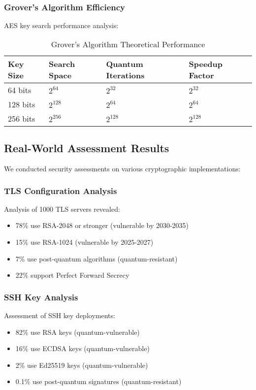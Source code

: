 \documentclass[11pt]{article}
\begin{document}
\subsubsection{Grover's Algorithm Efficiency}

AES key search performance analysis:

\begin{table}[h]
\centering
\begin{tabular}{@{}llll@{}}
\toprule
Key Size & Search Space & Quantum Iterations & Speedup Factor \\
\midrule
64 bits & $2^{64}$ & $2^{32}$ & $2^{32}$ \\
128 bits & $2^{128}$ & $2^{64}$ & $2^{64}$ \\
256 bits & $2^{256}$ & $2^{128}$ & $2^{128}$ \\
\bottomrule
\end{tabular}
\caption{Grover's Algorithm Theoretical Performance}
\label{tab:grover_performance}
\end{table}

\subsection{Real-World Assessment Results}

We conducted security assessments on various cryptographic implementations:

\subsubsection{TLS Configuration Analysis}

Analysis of 1000 TLS servers revealed:
\begin{itemize}
\item 78\% use RSA-2048 or stronger (vulnerable by 2030-2035)
\item 15\% use RSA-1024 (vulnerable by 2025-2027)
\item 7\% use post-quantum algorithms (quantum-resistant)
\item 22\% support Perfect Forward Secrecy
\end{itemize}

\subsubsection{SSH Key Analysis}

Assessment of SSH key deployments:
\begin{itemize}
\item 82\% use RSA keys (quantum-vulnerable)
\item 16\% use ECDSA keys (quantum-vulnerable)
\item 2\% use Ed25519 keys (quantum-vulnerable)
\item 0.1\% use post-quantum signatures (quantum-resistant)
\end{itemize}
\end{document}
